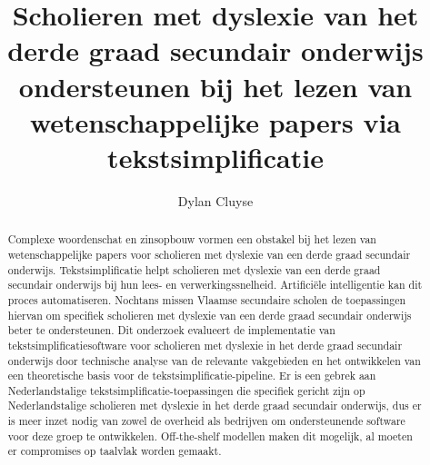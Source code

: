 \documentclass{hogent-article}
\title{Scholieren met dyslexie van het derde graad secundair onderwijs ondersteunen bij het lezen van wetenschappelijke papers via tekstsimplificatie}
\author{Dylan Cluyse}
\begin{document}
\begin{abstract}
Complexe woordenschat en zinsopbouw vormen een obstakel bij het lezen van wetenschappelijke papers voor scholieren met dyslexie van een derde graad secundair onderwijs. Tekstsimplificatie helpt scholieren met dyslexie van een derde graad secundair onderwijs bij hun lees- en verwerkingssnelheid. Artificiële intelligentie kan dit proces automatiseren. Nochtans missen Vlaamse secundaire scholen de toepassingen hiervan om specifiek scholieren met dyslexie van een derde graad secundair onderwijs beter te ondersteunen. Dit onderzoek evalueert de implementatie van tekstsimplificatiesoftware voor scholieren met dyslexie in het derde graad secundair onderwijs door technische analyse van de relevante vakgebieden en het ontwikkelen van een theoretische basis voor de tekstsimplificatie-pipeline. Er is een gebrek aan Nederlandstalige tekstsimplificatie-toepassingen die specifiek gericht zijn op Nederlandstalige scholieren met dyslexie in het derde graad secundair onderwijs, dus er is meer inzet nodig van zowel de overheid als bedrijven om ondersteunende software voor deze groep te ontwikkelen. Off-the-shelf modellen maken dit mogelijk, al moeten er compromises op taalvlak worden gemaakt. 

\end{abstract}

\tableofcontents



\printbibliography[heading=bibintoc]
\end{document}
